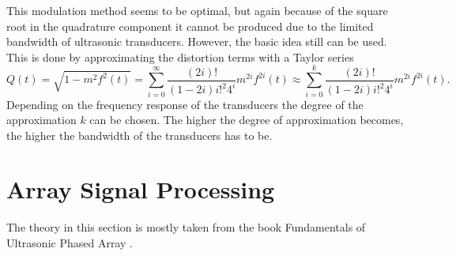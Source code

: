 This modulation method seems to be optimal, but again because of the square root in the quadrature component it cannot be produced due to the limited bandwidth of ultrasonic transducers. However, the basic idea still can be used. This is done by approximating the distortion terms with a Taylor series
\begin{equation}
    Q(t) 
    = 
    \sqrt{1 - m^2f^2(t)}
    = 
    \sum_{i=0}^\infty \frac{(2i)!}{(1-2i) i!^2 4^i}m^{2i}f^{2i}(t) 
    \approx 
    \sum_{i=0}^k \frac{(2i)!}{(1-2i) i!^2 4^i}m^{2i}f^{2i}(t).
    \label{3_eq:mam_distortion_approx}
\end{equation}
Depending on the frequency response of the transducers the degree of the approximation $k$ can be chosen. The higher the degree of approximation becomes, the higher the bandwidth of the transducers has to be.
\newpage

\section{Array Signal Processing}\label{3_Parametric_array_Sec:Array_signal_processing}
The theory in this section is mostly taken from the book Fundamentals of Ultrasonic Phased Array \cite{alma99116706330905515}.
